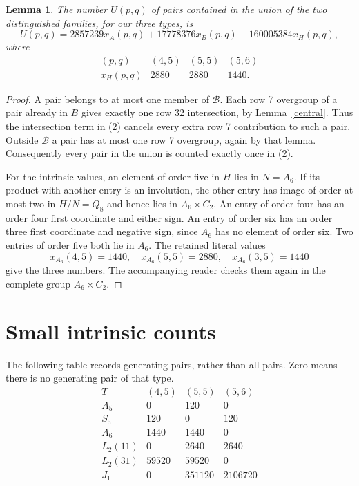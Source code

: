 \documentclass[11pt,a4paper]{article}
\newtheorem{lemma}{Lemma}\newtheorem{theorem}{Theorem}
\begin{document}
\begin{lemma}\label{covered}
The number $U(p,q)$ of pairs contained in the union of the two
distinguished families, for our three types, is
\[
 U(p,q)=2857239x_A(p,q)+17778376x_B(p,q)
                          -160005384x_H(p,q),
\tag{2}
\]
where
\[
 \begin{array}{c|rrr}
 (p,q)&(4,5)&(5,5)&(5,6)\\\hline
 x_H(p,q)&2880&2880&1440.
 \end{array}
\]
\end{lemma}
\begin{proof}
A pair belongs to at most one member of $\mathcal B$. Each row 7
overgroup of a pair already in $B$ gives exactly one row 32
intersection, by Lemma~\ref{central}. Thus the intersection term
in (2) cancels every extra row 7 contribution to such a pair.
Outside $\mathcal B$ a pair has at most one row 7 overgroup, again
by that lemma. Consequently every pair in the union is counted
exactly once in (2).

For the intrinsic values, an element of order five in $H$ lies in
$N=A_6$. If its product with another entry is an involution, the
other entry has image of order at most two in $H/N=Q_8$ and hence
lies in $A_6\times C_2$. An entry of order four has an order four
first coordinate and either sign. An entry of order six has an
order three first coordinate and negative sign, since $A_6$ has
no element of order six. Two entries of order five both lie in
$A_6$. The retained literal values
\[
 x_{A_6}(4,5)=1440,\quad x_{A_6}(5,5)=2880,
 \quad x_{A_6}(3,5)=1440
\]
give the three numbers. The accompanying reader checks them again
in the complete group $A_6\times C_2$.
\end{proof}

\section*{Small intrinsic counts}
The following table records generating pairs, rather than all
pairs. Zero means there is no generating pair of that type.
\[
\begin{array}{c|rrr}
 T&(4,5)&(5,5)&(5,6)\\\hline
 A_5&0&120&0\\
 S_5&120&0&120\\
 A_6&1440&1440&0\\
 L_2(11)&0&2640&2640\\
 L_2(31)&59520&59520&0\\
 J_1&0&351120&2106720
\end{array}
\tag{3}
\]
\end{document}
